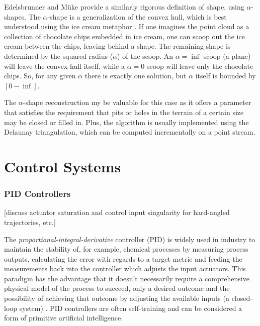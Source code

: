 Edelsbrunner and Müke \cite{Edelsbrunner1994}	provide a similarly rigorous definition of shape, using $\alpha$-shapes. The $\alpha$-shape is a generalization of the convex hull, which is best understood using the ice cream metaphor \cite{cgal:dy-as3-18b}. If one imagines the point cloud as a collection of chocolate chips embedded in ice cream, one can scoop out the ice cream between the chips, leaving behind a shape. The remaining shape is determined by the squared radius ($\alpha$) of the scoop. An $\alpha = \inf$ scoop (a plane) will leave the convex hull itself, while a $\alpha = 0$ scoop will leave only the chocolate chips. So, for any given $\alpha$ there is exactly one solution, but $\alpha$ itself is bounded by $[0-\inf]$.

The $\alpha$-shape reconstruction my be valuable for this case as it offers a parameter that satisfies the requirement that pits or holes in the terrain of a certain size may be closed or filled in. Plus, the algorithm is usually implemented using the Delaunay triangulation, which can be computed incrementally on a point stream.
\section{Control Systems}


\subsubsection{PID Controllers}

[discuss actuator saturation and control input singularity for hard-angled trajectories, etc.]


The \emph{proportional-integral-derivative} controller (PID) is widely used in industry \cite{Soediono1989} to maintain the stability of, for example, chemical processes by measuring process outputs, calculating the error with regards to a target metric and feeding the measurements back into the controller which adjusts the input actuators. This paradigm has the advantage that it doesn’t necessarily require a comprehensive physical model of the process to succeed, only a desired outcome and the possibility of achieving that outcome by adjusting the available inputs (a closed-loop system) \cite{Soediono1989}. PID controllers are often self-training and can be considered a form of primitive artificial intelligence.

